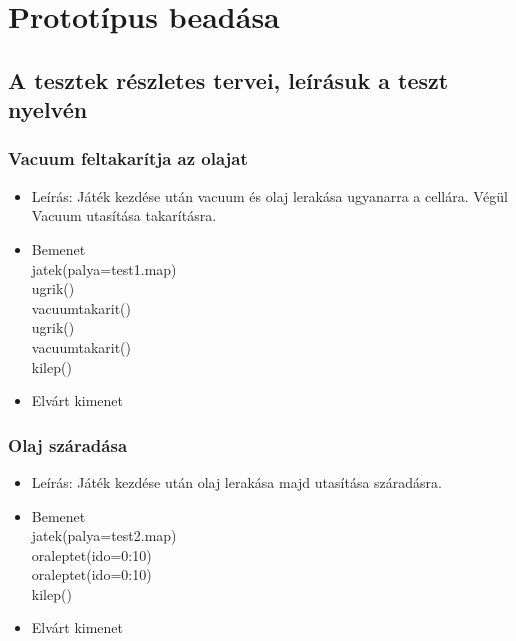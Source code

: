 %
\chapter{Prototípus beadása}

\thispagestyle{fancy}

\setcounter{section}{-1}
\section{A tesztek részletes tervei, leírásuk a teszt nyelvén}


\subsection{Vacuum feltakarítja az olajat}
\begin{itemize}
	\item Leírás: Játék kezdése után vacuum és olaj lerakása ugyanarra a cellára. Végül Vacuum utasítása takarításra.
	\item Bemenet\\
    jatek(palya=test1.map) \\
    ugrik() \\
    vacuumtakarit() \\
    ugrik() \\
    vacuumtakarit() \\
    kilep() \\
	\item Elvárt kimenet\\

\end{itemize}

\subsection{Olaj száradása}
\begin{itemize}
	\item Leírás: Játék kezdése után olaj lerakása majd utasítása száradásra.
	\item Bemenet\\
    jatek(palya=test2.map) \\
    oraleptet(ido=0:10) \\
    oraleptet(ido=0:10) \\
    kilep() \\
	\item Elvárt kimenet\\
	
\end{itemize}

